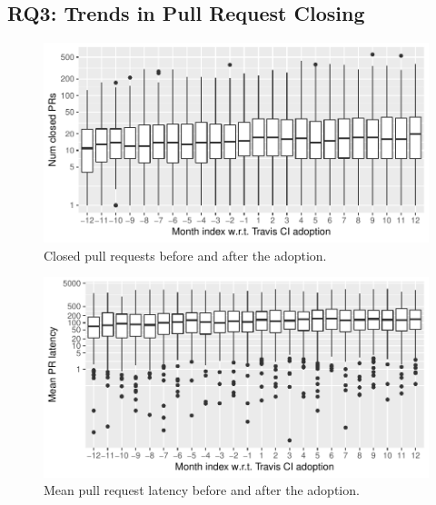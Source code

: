 


%
%




\subsection{RQ3: Trends in Pull Request Closing}

\begin{figure}[t]
\centering
\includegraphics[width=\columnwidth, clip=true, trim=0 0 0 0]{figures/pr-closed.pdf}
\caption{Closed pull requests before and after the \Tvis adoption.}
\label{fig:prs}
\end{figure}




\begin{figure}[t]
\centering
\includegraphics[width=\columnwidth, clip=true, trim=0 0 0 0]{figures/pr-latency.pdf}
\caption{Mean pull request latency before and after the \Tvis adoption.}
\label{fig:pr-latency}
\end{figure}

